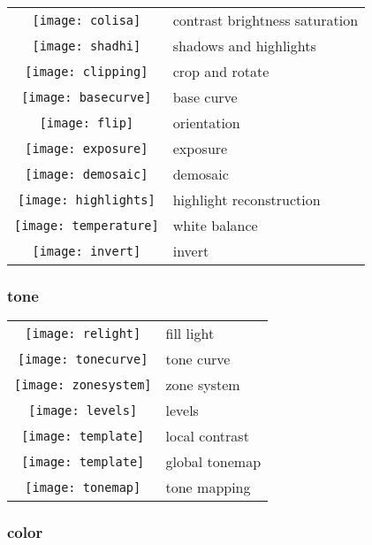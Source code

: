 \documentclass[\ArgLang,\ArgFormat,9pt]{extarticle}
\begin{document}
\begin{multicols}{3}
  \colorbox{keycol}{%
    \begin{tabularx}{\tabwidth}{cl} 
      \texttt{[image: colisa]} & contrast brightness saturation \\
      \texttt{[image: shadhi]} & shadows and highlights \\
      \texttt{[image: clipping]} & crop and rotate \\
      \texttt{[image: basecurve]} & base curve \\
      \texttt{[image: flip]} & orientation \\
      \texttt{[image: exposure]} & exposure \\
      \texttt{[image: demosaic]} & demosaic \\
      \texttt{[image: highlights]} & highlight reconstruction \\
      \texttt{[image: temperature]} & white balance \\
      \texttt{[image: invert]} & invert \\
    \end{tabularx}}
  
  \subsubsection{tone}
  
  \colorbox{keycol}{%
    \begin{tabularx}{\tabwidth}{cl} 
      \texttt{[image: relight]} & fill light \\
      \texttt{[image: tonecurve]} & tone curve \\
      \texttt{[image: zonesystem]} & zone system \\
      \texttt{[image: levels]} & levels \\
      \texttt{[image: template]} & local contrast \\
      \texttt{[image: template]} & global tonemap \\
      \texttt{[image: tonemap]} & tone mapping \\
    \end{tabularx}}
  
  \subsubsection{color}


\end{multicols}
\end{document}
